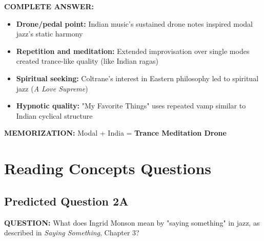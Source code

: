 \documentclass[11pt]{article}
\begin{document}
\begin{mdframed}[backgroundcolor=answercolor!10, linewidth=2pt]
\textbf{\textcolor{answercolor}{COMPLETE ANSWER:}}

\begin{itemize}[leftmargin=*, nosep]
    \item \textbf{Drone/pedal point:} Indian music's sustained drone notes inspired modal jazz's static harmony
    \item \textbf{Repetition and meditation:} Extended improvisation over single modes created trance-like quality (like Indian ragas)
    \item \textbf{Spiritual seeking:} Coltrane's interest in Eastern philosophy led to spiritual jazz (\textit{A Love Supreme})
    \item \textbf{Hypnotic quality:} "My Favorite Things" uses repeated vamp similar to Indian cyclical structure
\end{itemize}

\vspace{5pt}
\end{mdframed}

\textbf{MEMORIZATION:} Modal + India = \textbf{\textcolor{modal}{Trance Meditation Drone}}

\newpage

\section{Reading Concepts Questions}

\subsection*{Predicted Question 2A}

\begin{mdframed}[backgroundcolor=questioncolor!10, linewidth=2pt]
\textbf{\textcolor{questioncolor}{QUESTION:}} What does Ingrid Monson mean by "saying something" in jazz, as described in \textit{Saying Something}, Chapter 3?
\end{mdframed}
\end{document}

